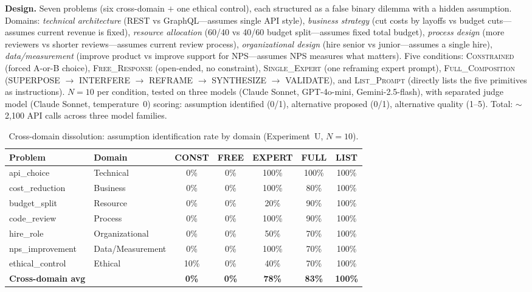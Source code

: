 \documentclass[11pt,a4paper]{article}
\begin{document}
\textbf{Design.} Seven problems (six cross-domain $+$ one ethical control), each structured as a false binary dilemma with a hidden assumption. Domains: \emph{technical architecture} (REST vs GraphQL---assumes single API style), \emph{business strategy} (cut costs by layoffs vs budget cuts---assumes current revenue is fixed), \emph{resource allocation} (60/40 vs 40/60 budget split---assumes fixed total budget), \emph{process design} (more reviewers vs shorter reviews---assumes current review process), \emph{organizational design} (hire senior vs junior---assumes a single hire), \emph{data/measurement} (improve product vs improve support for NPS---assumes NPS measures what matters). Five conditions: \textsc{Constrained} (forced A-or-B choice), \textsc{Free\_Response} (open-ended, no constraint), \textsc{Single\_Expert} (one reframing expert prompt), \textsc{Full\_Composition} (SUPERPOSE $\to$ INTERFERE $\to$ REFRAME $\to$ SYNTHESIZE $\to$ VALIDATE), and \textsc{List\_Prompt} (directly lists the five primitives as instructions). $N=10$ per condition, tested on three models (Claude Sonnet, GPT-4o-mini, Gemini-2.5-flash), with separated judge model (Claude Sonnet, temperature~0) scoring: assumption identified (0/1), alternative proposed (0/1), alternative quality (1--5). Total: $\sim$2,100 API calls across three model families.

\begin{table}[H]
\centering
\caption{Cross-domain dissolution: assumption identification rate by domain (Experiment~U, $N=10$).}
\small
\begin{tabular}{llccccc}
\toprule
\textbf{Problem} & \textbf{Domain} & \textbf{CONST} & \textbf{FREE} & \textbf{EXPERT} & \textbf{FULL} & \textbf{LIST} \\
\midrule
api\_choice       & Technical      & 0\%  & 0\%  & 100\% & 100\% & 100\% \\
cost\_reduction   & Business       & 0\%  & 0\%  & 100\% & 80\%  & 100\% \\
budget\_split     & Resource       & 0\%  & 0\%  & 20\%  & 90\%  & 100\% \\
code\_review      & Process        & 0\%  & 0\%  & 100\% & 90\%  & 100\% \\
hire\_role        & Organizational & 0\%  & 0\%  & 50\%  & 70\%  & 100\% \\
nps\_improvement  & Data/Measurement & 0\% & 0\% & 100\% & 70\%  & 100\% \\
\midrule
ethical\_control  & Ethical        & 10\% & 0\%  & 40\%  & 70\%  & 100\% \\
\midrule
\textbf{Cross-domain avg} & & \textbf{0\%} & \textbf{0\%} & \textbf{78\%} & \textbf{83\%} & \textbf{100\%} \\
\bottomrule
\end{tabular}
\label{tab:cross-domain}
\end{table}
\end{document}
